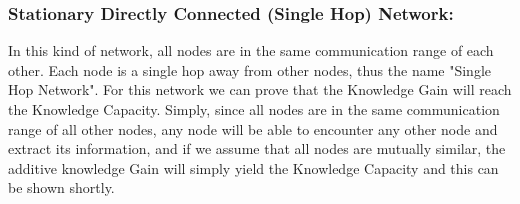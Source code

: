 \documentclass[11pt]{article}
\begin{document}
\subsubsection{ Stationary Directly Connected (Single Hop) Network:}

In this kind of network, all nodes are in the same communication range of each other. Each node is a single hop away from other nodes, thus the name "Single Hop Network".
For this network we can prove that the Knowledge Gain will reach the Knowledge Capacity.
Simply, since all nodes are in the same communication range of all other nodes, any node will be able to encounter any other node and extract its information, and if we assume that all nodes are mutually similar, the additive knowledge Gain will simply yield the Knowledge Capacity and this can be shown shortly.\\
\end{document}
